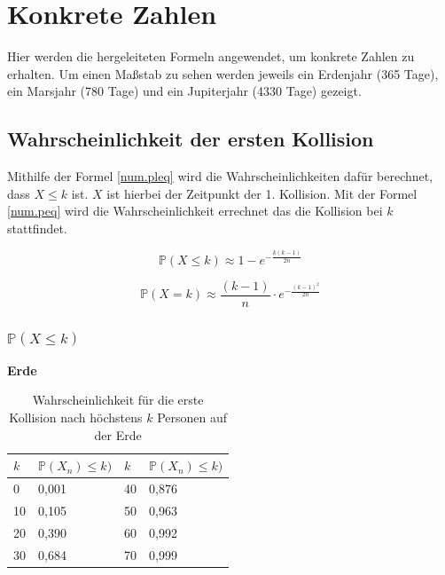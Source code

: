 \documentclass[../main.tex]{subfiles}
\begin{document}
\section{Konkrete Zahlen}
Hier werden die hergeleiteten Formeln angewendet, um konkrete Zahlen zu erhalten.
Um einen Maßstab zu sehen werden jeweils ein Erdenjahr (365 Tage), ein Marsjahr (780 Tage) und ein Jupiterjahr (4330 Tage) gezeigt.
\subsection{Wahrscheinlichkeit der ersten Kollision}

Mithilfe der Formel \ref{num.pleq} wird die Wahrscheinlichkeiten dafür berechnet, dass $X \leq k$ ist. $X$ ist hierbei der
Zeitpunkt der 1. Kollision.
Mit der Formel \ref{num.peq} wird die Wahrscheinlichkeit errechnet das die Kollision bei $k$ stattfindet.

\begin{equation}
 \mathbb{P}(X \leq k) \approx 1 - e^{- \frac{k(k-1)}{2n}}
 \label{num.pleq}
\end{equation}

\begin{equation}
 \mathbb{P}(X = k) \approx \frac{(k-1)}{n} \cdot e^{- \frac{(k-1)^2}{2n}}
 \label{num.peq}
\end{equation}

\subsubsection{$\mathbb{P}(X \leq k)$}

\textbf{Erde}

\begin{table}[h]
\centering
\begin{tabular}{|l|l|l|l|}
\hline
$k$  & $\mathbb{P}(X_{n}) \leq k)$ & $k$  & $\mathbb{P}(X_{n}) \leq k)$ \\ \hline
0  & 0,001            & 40 & 0,876            \\
10 & 0,105            & 50 & 0,963            \\
20 & 0,390            & 60 & 0,992            \\
30 & 0,684            & 70 & 0,999            \\ \hline
\end{tabular}
\caption{\label{num.tpe} Wahrscheinlichkeit für die erste Kollision nach höchstens $k$ Personen auf der Erde}
\end{table}
\end{document}
